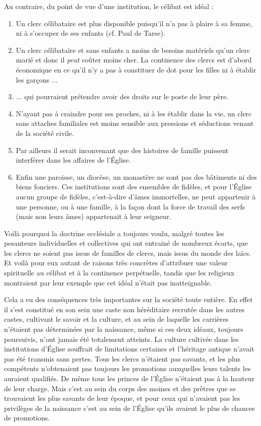  Au contraire, du point de vue d'une institution, le célibat est idéal :
\begin{enumerate}
\item Un clerc célibataire est plus disponible puisqu'il n'a pas à plaire à sa femme, ni à s'occuper de ses enfants (cf. Paul de Tarse).
\item Un clerc célibataire et sans enfants a moins de besoins matériels qu'un clerc marié et donc il \emph{peut} coûter moins cher. La continence des clercs est d'abord économique en ce qu'il n'y a pas à constituer de dot pour les filles ni à établir les garçons ...
\item ... qui pourraient prétendre avoir des droits sur le poste de leur père.
\item N'ayant pas à craindre pour ses proches, ni à les établir dans la vie, un clerc sans attaches familiales est moins sensible aux pressions et séductions venant de la société civile.
\item Par ailleurs il serait inconvenant que des histoires de famille puissent interférer dans les affaires de l'Église.
\item Enfin une paroisse, un diocèse, un monastère ne sont pas des bâtiments ni des biens fonciers. Ces institutions sont des ensembles de fidèles, et pour l'Église aucun groupe de fidèles, c'est-à-dire d'âmes immortelles, ne peut appartenir à une personne, ou à une famille, à la façon dont la force de travail des serfs (mais non leurs âmes) appartenait à leur seigneur.
\end{enumerate} 

 Voilà pourquoi la doctrine ecclésiale a toujours voulu, malgré toutes les pesanteurs individuelles et collectives qui ont entrainé de nombreux écarts, que les clercs ne soient pas issus de familles de clercs, mais issus du monde des laïcs. Et voilà pour eux autant de raisons très concrètes d'attribuer une valeur spirituelle au célibat et à la continence perpétuelle, tandis que les religieux montraient par leur exemple que cet idéal n'était pas inatteignable. 

 Cela a eu des conséquences très importantes sur la société toute entière. En effet il s'est constitué en son sein une caste non héréditaire recrutée dans les autres castes, cultivant le savoir et la culture, et au sein de laquelle les carrières n'étaient pas déterminées par la naissance, même si ces deux idéaux, toujours poursuivis, n'ont jamais été totalement atteints. La culture cultivée dans les institutions d'Église souffrait de limitations certaines et l'héritage antique n'avait pas été transmis sans pertes. Tous les clercs n'étaient pas savants, et les plus compétents n'obtenaient pas toujours les promotions auxquelles leurs talents les auraient qualifiés. De même tous les princes de l'Église n'étaient pas à la hauteur de leur charge. Mais c'est au sein du corps des moines et des prêtres que se trouvaient les plus savants de leur époque, et pour ceux qui n'avaient pas les privilèges de la naissance c'est au sein de l'Église qu'ils avaient le plus de chances de promotions. 
 
